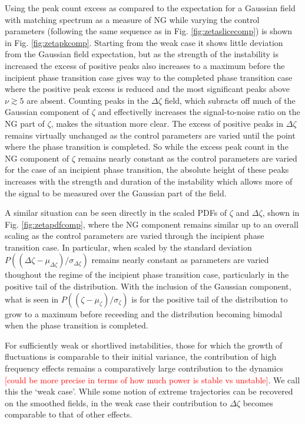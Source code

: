 Using the peak count excess as compared to the expectation for a Gaussian field with matching spectrum as a measure of NG while varying the control parameters (following the same sequence as in Fig. \ref{fig:zetaslicecomp}) is shown in Fig. \ref{fig:zetapkcomp}. Starting from the weak case it shows little deviation from the Gaussian field expectation, but as the strength of the instability is increased the excess of positive peaks also increases to a maximum before the incipient phase transition case gives way to the completed phase transition case where the positive peak excess is reduced and the most significant peaks above $\nu \gtrsim 5$ are absent. Counting peaks in the $\Delta\zeta$ field, which subracts off much of the Gaussian component of $\zeta$ and effectivelly increases the signal-to-noise ratio on the NG part of $\zeta$, makes the situation more clear. The excess of positive peaks in $\Delta\zeta$ remains virtually unchanged as the control parameters are varied until the point where the phase transition is completed. So while the excess peak count in the NG component of $\zeta$ remains nearly constant as the control parameters are varied for the case of an incipient phase transition, the absolute height of these peaks increases with the strength and duration of the instability which allows more of the signal to be measured over the Gaussian part of the field.

A similar situation can be seen directly in the scaled PDFs of $\zeta$ and $\Delta\zeta$, shown in Fig. \ref{fig:zetapdfcomp}, where the NG component remains similar up to an overall scaling as the control parameters are varied through the incipient phase transition case. In particular, when scaled by the standard deviation $P((\Delta\zeta - \mu_{\Delta\zeta})/\sigma_{\Delta\zeta})$ remains nearly constant as parameters are varied thoughout the regime of the incipient phase transition case, particularly in the positive tail of the distribution. With the inclusion of the Gaussian component, what is seen in $P((\zeta - \mu_\zeta)/\sigma_\zeta)$ is for the positive tail of the distribution to grow to a maximum before receeding and the distribution becoming bimodal when the phase transition is completed.

For sufficiently weak or shortlived instabilities, those for which the growth of fluctuations is comparable to their initial variance, the contribution of high frequency effects remains a comparatively large contribution to the dynamics \textcolor{red}{[could be more precise in terms of how much power is stable vs unstable]}.
We call this the `weak case'.
While some notion of extreme trajectories can be recovered on the smoothed fields, in the weak case their contribution to $\Delta\zeta$ becomes comparable to that of other effects.

